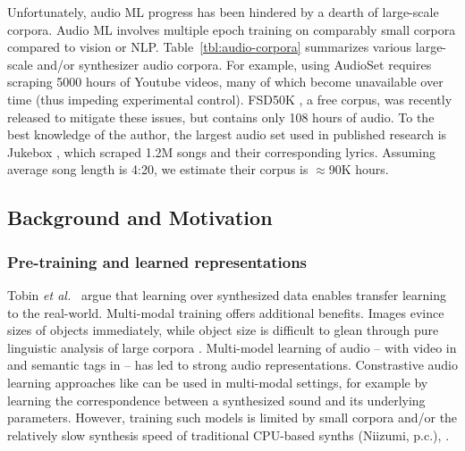 Unfortunately, audio ML progress has been hindered by a dearth of large-scale corpora. Audio ML involves multiple epoch training on comparably small corpora compared to vision or NLP. Table~\ref{tbl:audio-corpora} summarizes various large-scale and/or synthesizer audio corpora.
For example, using AudioSet \cite{45857} requires scraping 5000 hours of Youtube videos, many of which become unavailable over time (thus impeding experimental control). FSD50K \cite{fonseca2020fsd50k}, a free corpus, was recently released to mitigate these issues, but contains only 108 hours of audio. To the best knowledge of the author, the largest audio set used in published research is Jukebox \cite{dhariwal2020jukebox}, which scraped 1.2M songs and their corresponding lyrics. Assuming average song length is 4:20, we estimate their corpus is $\approx$90K hours. 

\subsection{Background and Motivation}

\subsubsection{Pre-training and learned representations}

Tobin {\em et al.}~\cite{DBLP:conf/iros/TobinFRSZA17} argue that learning over synthesized data enables transfer learning to the real-world.
Multi-modal training offers additional benefits.
Images evince sizes of objects immediately, while object size is difficult to glean through pure linguistic analysis of large corpora  \cite{DBLP:conf/acl/ElazarMRBR19}.
Multi-model learning of audio -- with video in \cite{DBLP:conf/icassp/CramerWSB19} and semantic tags in \cite{drossos:icml:2020} -- has led to strong audio representations.
Constrastive audio learning approaches like \cite{saeed2020contrastive} can be used in multi-modal settings, for example by learning the correspondence between a synthesized sound and its underlying parameters.
However, training such models is limited by small corpora and/or the relatively slow synthesis speed of traditional CPU-based synths (Niizumi, p.c.),  \cite{masudo2021quality}.



